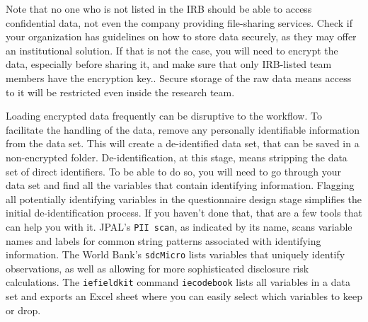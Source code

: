 Note that no one who is not listed in the IRB should be able to access confidential data, 
not even the company providing file-sharing services.
Check if your organization has guidelines on how to store data securely, as they may offer an institutional solution. 
If that is not the case, you will need to encrypt the data, especially before
sharing it, and make sure that only IRB-listed team members have the
encryption key..
Secure storage of the raw data means access to it will be restricted even inside the research team.

Loading encrypted data frequently can be disruptive to the workflow.
To facilitate the handling of the data, remove any personally identifiable information from the data set.
This will create a de-identified data set, that can be saved in a non-encrypted folder. 
De-identification,
at this stage, means stripping the data set of direct identifiers.
To be able to do so, you will need to go through your data set and
find all the variables that contain identifying information.
Flagging all potentially identifying variables in the questionnaire design stage 
simplifies the initial de-identification process.
If you haven't done that, that are a few tools that can help you with it.
JPAL's \texttt{PII scan}, as indicated by its name,
scans variable names and labels for common string patterns associated with identifying information.
The World Bank's \texttt{sdcMicro}
lists variables that uniquely identify observations,
as well as allowing for more sophisticated disclosure risk calculations.
The \texttt{iefieldkit} command \texttt{iecodebook}
lists all variables in a data set and exports an Excel sheet
where you can easily select which variables to keep or drop. 


